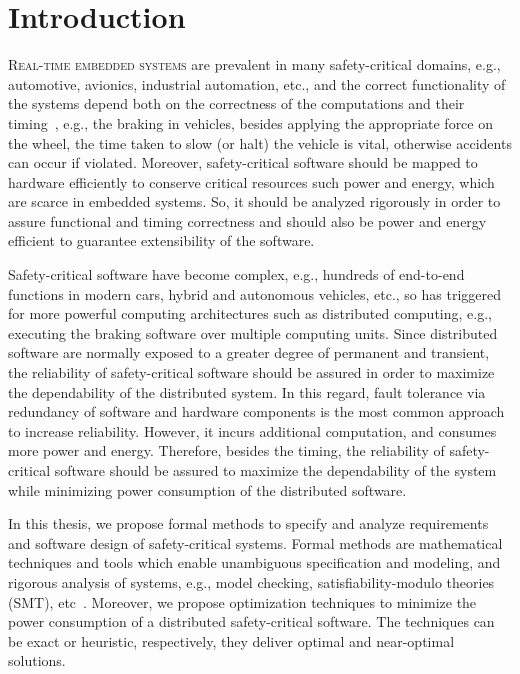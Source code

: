 \chapter{Introduction}\label{chapter_introduction}
\lettrine{R}{eal-time embedded systems} are prevalent in many safety-critical domains, e.g., automotive, avionics, industrial automation, etc., and the correct functionality of the systems depend both on the correctness of the computations and their timing~\cite{Lee2011IntroductionApproach}\cite{WangJiacun2017RES}, e.g., the braking in vehicles, besides applying the appropriate force on the wheel, the time taken to slow (or halt) the vehicle is vital, otherwise accidents can occur if violated. Moreover, safety-critical software should be mapped to hardware efficiently to conserve critical resources such power and energy, which are scarce in embedded systems. So, it should be analyzed rigorously in order to assure functional and timing correctness and should also be power and energy efficient to guarantee extensibility of the software.

Safety-critical software have become complex, e.g., hundreds of end-to-end functions in modern cars, hybrid and autonomous vehicles, etc., so has triggered for more powerful computing architectures such as distributed computing, e.g., executing the braking software over multiple computing units. Since distributed software are normally exposed to a greater degree of permanent and transient, the reliability of safety-critical software should be assured in order to maximize the dependability of the distributed system. In this regard, fault tolerance via redundancy of software and hardware components is the most common approach to increase reliability. However, it incurs additional computation, and consumes more power and energy. Therefore, besides the timing, the reliability of safety-critical software should be assured to maximize the dependability of the system while minimizing power consumption of the distributed software.

In this thesis, we propose formal methods to specify and analyze requirements and software design of safety-critical systems. Formal methods are mathematical techniques and tools which enable unambiguous specification and modeling, and rigorous analysis of systems, e.g., model checking, satisfiability-modulo theories (SMT), etc~\cite{o2017concise}. Moreover, we propose optimization techniques to minimize the power consumption of a distributed safety-critical software. The techniques can be exact or heuristic, respectively, they deliver optimal and near-optimal solutions.

